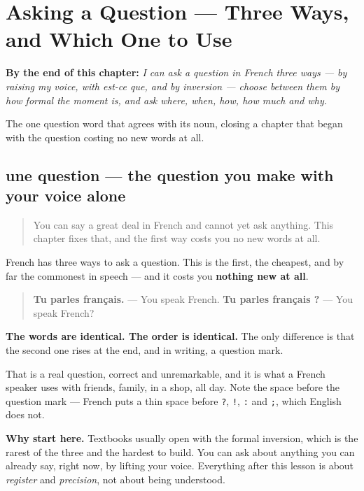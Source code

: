 
\chapter{Asking a Question — Three Ways, and Which One to Use}
\label{ch:fr-questions}

\begin{chapteropening}
\textbf{By the end of this chapter:} \emph{I can ask a question in French three ways — by raising my voice, with est-ce que, and by inversion — choose between them by how formal the moment is, and ask where, when, how, how much and why.}

The one question word that agrees with its noun, closing a chapter that began with the question costing no new words at all.
\end{chapteropening}

\section[une question]{une question — the question you make with your voice alone}

\label{lesson:FR-C32-intonation}



\begin{quote}
You can say a great deal in French and cannot yet ask anything. This chapter fixes that, and the first way costs you no new words at all.
\end{quote}

\begin{cousinweb}
French has three ways to ask a question. This is the first, the cheapest, and by far the commonest in speech — and it costs you \textbf{nothing new at all}.

\begin{quote}
\textbf{Tu parles français.}  — You speak French. \textbf{Tu parles français ?}  — You speak French?
\end{quote}

\textbf{The words are identical. The order is identical.} The only difference is that the second one rises at the end, and in writing, a question mark.

That is a real question, correct and unremarkable, and it is what a French speaker uses with friends, family, in a shop, all day. Note the space before the question mark — French puts a thin space before \texttt{?}, \texttt{!}, \texttt{:} and \texttt{;}, which English does not.

\textbf{Why start here.} Textbooks usually open with the formal inversion, which is the rarest of the three and the hardest to build. You can ask about anything you can already say, right now, by lifting your voice. Everything after this lesson is about \emph{register} and \emph{precision}, not about being understood.
\end{cousinweb}

